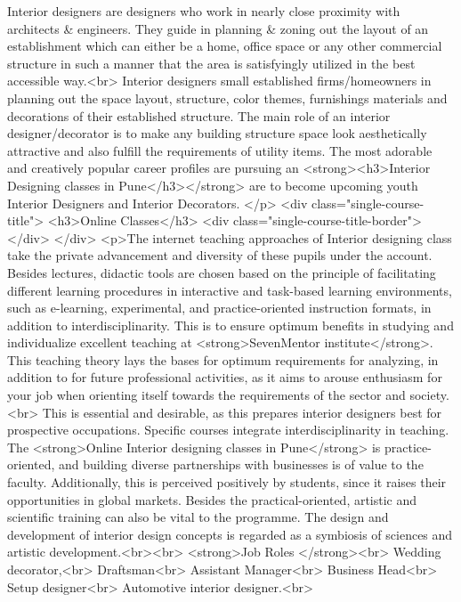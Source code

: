 {Interior designers are designers who work in nearly close proximity with architects & engineers. They guide in planning & zoning out the layout of an establishment which can either be a home, office space or any other commercial structure in such a manner that the area is satisfyingly utilized in the best accessible way.<br>
Interior designers small established firms/homeowners in planning out the space layout, structure, color themes, furnishings materials and decorations of their established structure. The main role of an interior designer/decorator is to make any building structure space look aesthetically attractive and also fulfill the requirements of utility items. The most adorable and creatively popular career profiles are pursuing an <strong><h3>Interior Designing classes in Pune</h3></strong> are to become upcoming youth Interior Designers and Interior Decorators.
</p>
<div class="single-course-title">
<h3>Online Classes</h3>
<div class="single-course-title-border"></div>
</div>
<p>The internet teaching approaches of Interior designing class take the private advancement and diversity of these pupils under the account. Besides lectures, didactic tools are chosen based on the principle of facilitating different learning procedures in interactive and task-based learning environments, such as e-learning, experimental, and practice-oriented instruction formats, in addition to interdisciplinarity. This is to ensure optimum benefits in studying and individualize excellent teaching at <strong>SevenMentor institute</strong>. This teaching theory lays the bases for optimum requirements for analyzing, in addition to for future professional activities, as it aims to arouse enthusiasm for your job when orienting itself towards the requirements of the sector and society.<br>
This is essential and desirable, as this prepares interior designers best for prospective occupations. Specific courses integrate interdisciplinarity in teaching. The <strong>Online Interior designing classes in Pune</strong> is practice-oriented, and building diverse partnerships with businesses is of value to the faculty. Additionally, this is perceived positively by students, since it raises their opportunities in global markets. Besides the practical-oriented, artistic and scientific training can also be vital to the programme. The design and development of interior design concepts is regarded as a symbiosis of sciences and artistic development.<br><br>
<strong>Job Roles
</strong><br>
Wedding decorator,<br>
Draftsman<br>
Assistant Manager<br>
Business Head<br>
Setup designer<br>
Automotive interior designer.<br>
}
